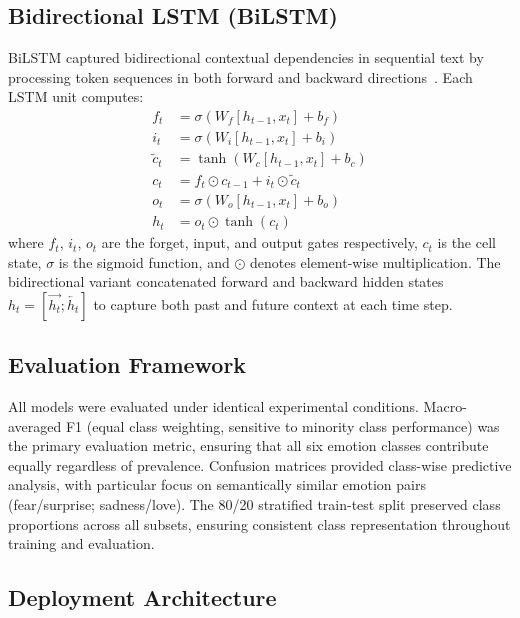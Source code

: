 \subsection{Bidirectional LSTM (BiLSTM)}

BiLSTM captured bidirectional contextual dependencies in sequential text by processing token sequences in both forward and backward directions~\citep{sun2023bidirectional}. Each LSTM unit computes:
\begin{align}
f_t &= \sigma(W_f [h_{t-1}, x_t] + b_f) \label{eq:forget}\\
i_t &= \sigma(W_i [h_{t-1}, x_t] + b_i) \label{eq:input}\\
\tilde{c}_t &= \tanh(W_c [h_{t-1}, x_t] + b_c) \label{eq:candidate}\\
c_t &= f_t \odot c_{t-1} + i_t \odot \tilde{c}_t \label{eq:cell}\\
o_t &= \sigma(W_o [h_{t-1}, x_t] + b_o) \label{eq:output_gate}\\
h_t &= o_t \odot \tanh(c_t) \label{eq:hidden}
\end{align}
where $f_t$, $i_t$, $o_t$ are the forget, input, and output gates respectively, $c_t$ is the cell state, $\sigma$ is the sigmoid function, and $\odot$ denotes element-wise multiplication. The bidirectional variant concatenated forward and backward hidden states $h_t = [\overrightarrow{h_t}; \overleftarrow{h_t}]$ to capture both past and future context at each time step.

\subsection{Evaluation Framework}

All models were evaluated under identical experimental conditions. Macro-averaged F1 (equal class weighting, sensitive to minority class performance) was the primary evaluation metric, ensuring that all six emotion classes contribute equally regardless of prevalence. Confusion matrices provided class-wise predictive analysis, with particular focus on semantically similar emotion pairs (fear/surprise; sadness/love). The 80/20 stratified train-test split preserved class proportions across all subsets, ensuring consistent class representation throughout training and evaluation.

\subsection{Deployment Architecture}

